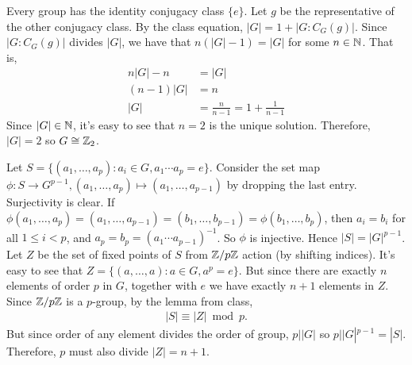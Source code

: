 \documentclass[12pt]{article}
\begin{document}
\begin{problem}[7]
Every group has the identity conjugacy class $ \{e\} $. Let $ g$ be the representative of the other conjugacy class. By the class equation, $ |G| = 1+ |G:C_G(g)|$. Since  $ |G:C_G(g)|$ divides $ |G|$, we have that $ n(|G|-1) = |G|$ for some $ n \in \mathbb{N}$. That is,
\begin{align*}
	n|G|-n &= |G| \\
	(n-1)|G|&= n \\
	|G|&= \frac{n}{n-1}=1+ \frac{1}{n-1} 
\end{align*}
Since $ |G| \in \mathbb{N}$, it's easy to see that $ n=2$ is the unique solution. Therefore,  $ |G|=2$ so  $ G \cong \mathbb{Z}_2$.
\end{problem}

\begin{problem}[8]
	Let $ S = \{(a_1,\ldots,a_p): a_i \in G, a_1 \cdots a_p = e\}$. Consider the set map $\phi: S \to G^{p-1}, (a_1,\ldots,a_p) \mapsto (a_1,\ldots,a_{p-1})$ by dropping the last entry. Surjectivity is clear. If $ \phi(a_1,\ldots,a_p) = (a_1,\ldots,a_{p-1}) = (b_1,\ldots,b_{p-1}) = \phi(b_1,\ldots,b_{p})$, then $ a_i = b_i$ for all $ 1\leq i <p$, and  $ a_p = b_p = (a_1 \cdots a_{p-1})^{-1}$. So $ \phi$ is injective. Hence $ |S| = |G|^{p-1}$. Let $ Z$ be the set of fixed points of $ S$ from $ \mathbb{Z} / p\mathbb{Z}$ action (by shifting indices). It's easy to see that $ Z = \{(a,\ldots,a): a \in G, a^{p}=e\}$. But since there are exactly $ n$ elements of order  $ p$ in  $ G$, together with  $ e$ we have exactly  $ n+1$ elements in  $ Z$. Since $ \mathbb{Z}/p \mathbb{Z}$ is a $ p$-group, by the lemma from class,
	 \begin{align*}
		|S| \equiv |Z| \bmod p.
	\end{align*}
	But since order of any element divides the order of group,  $ p||G|$ so  $ p| |G|^{p-1} = |S|$. Therefore, $ p$ must also divide $ |Z| = n+1$.
\end{problem}
\end{document}
